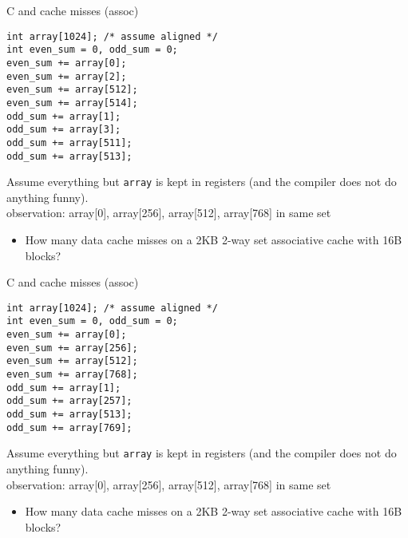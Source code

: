 \begin{frame}[fragile,label=arrayMissesAssocBig1]{C and cache misses (assoc)}
\begin{lstlisting}[style=smaller]
int array[1024]; /* assume aligned */
int even_sum = 0, odd_sum = 0;
even_sum += array[0];
even_sum += array[2];
even_sum += array[512];
even_sum += array[514];
odd_sum += array[1];
odd_sum += array[3];
odd_sum += array[511];
odd_sum += array[513];
\end{lstlisting}
{\small
Assume everything but {\tt array} is kept in registers (and the compiler does not do
anything funny).\\
observation: array[0], array[256], array[512], array[768] in same set}
\begin{itemize}
\item How many data cache misses on a 2KB 2-way set associative cache with 16B blocks?
\end{itemize}
\end{frame}

\begin{frame}[fragile,label=arrayMissesAssocBig2]{C and cache misses (assoc)}
\begin{lstlisting}[style=smaller]
int array[1024]; /* assume aligned */
int even_sum = 0, odd_sum = 0;
even_sum += array[0];
even_sum += array[256];
even_sum += array[512];
even_sum += array[768];
odd_sum += array[1];
odd_sum += array[257];
odd_sum += array[513];
odd_sum += array[769];
\end{lstlisting}
{\small
Assume everything but {\tt array} is kept in registers (and the compiler does not do
anything funny).\\
observation: array[0], array[256], array[512], array[768] in same set}
\begin{itemize}
\item How many data cache misses on a 2KB 2-way set associative cache with 16B blocks?
\end{itemize}
\end{frame}
